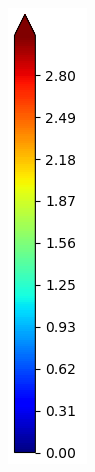 \documentclass[journal=jpcbfk,manusciprt=article]{achemso}
\begin{document}
\begin{figure}[!htb]
\begin{subfigure}{0.1\textwidth}
		\includegraphics[width=\linewidth]{colorbar_jet.png}

\end{subfigure}
\end{figure}
\end{document}
